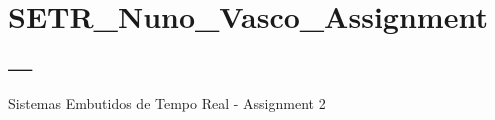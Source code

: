 \chapter{SETR\+\_\+\+Nuno\+\_\+\+Vasco\+\_\+\+Assignment\+\_}
\hypertarget{md_README}{}\label{md_README}
\label{md_README_autotoc_md0}%
%
Sistemas Embutidos de Tempo Real -\/ Assignment 2 